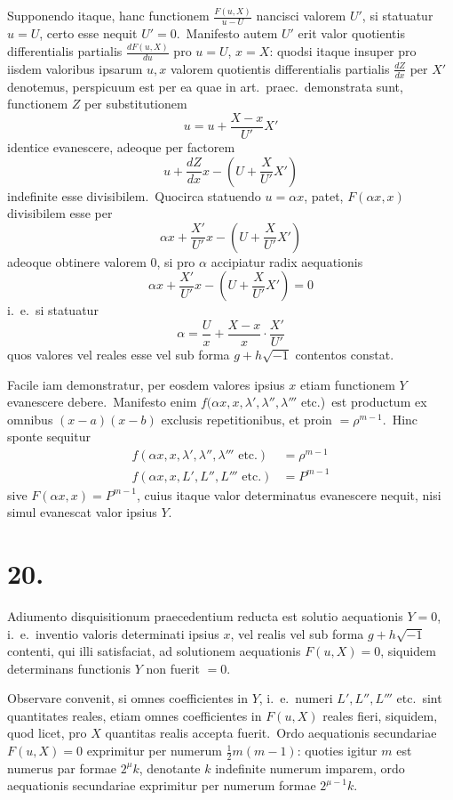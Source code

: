 \documentclass[12pt,a4paper]{article}
\theoremstyle{plain}
\begin{document}
Supponendo itaque, hanc functionem $\frac{F(u, X)}{u - U}$ nancisci valorem $U'$, si statuatur $u = U$, certo esse nequit $U' = 0$.\ Manifesto autem $U'$ erit valor quotientis differentialis partialis $\frac{dF(u, X)}{du}$ pro $u = U$, $x = X$:
quodsi itaque insuper pro iisdem valoribus ipsarum $u, x$ valorem quotientis differentialis partialis $\frac{dZ}{dx}$ per $X'$ denotemus, perspicuum est per ea quae in art.\ praec.\ demonstrata sunt, functionem $Z$ per substitutionem
\[
u = u + \frac{X - x}{U'}X'
\]
identice evanescere, adeoque per factorem
\[
u + \frac{dZ}{dx}x - (U + \frac{X}{U'}X')
\]
indefinite esse divisibilem.\ Quocirca statuendo $u = \alpha x$, patet, $F(\alpha x, x)$ divisibilem esse per
\[
\alpha x + \frac{X'}{U'}x - (U + \frac{X}{U'}X')
\]
adeoque obtinere valorem $0$, si pro $\alpha$ accipiatur radix aequationis
\[
\alpha x + \frac{X'}{U'}x - (U + \frac{X}{U'}X') = 0
\]
i.\ e.\ si statuatur
\[
\alpha = \frac{U}{x} + \frac{X - x}{x} \cdot \frac{X'}{U'}
\]
quos valores vel reales esse vel sub forma $g + h\sqrt{-1}$ contentos constat.

Facile iam demonstratur, per eosdem valores ipsius $x$ etiam functionem $Y$
evanescere debere.\ Manifesto enim $f(\alpha x, x, \lambda', \lambda'', \lambda'''$ etc.)\ est productum ex omnibus $(x-a)(x-b)$ exclusis repetitionibus, et proin $= \rho^{m-1}$.\ Hinc sponte sequitur
\begin{align*}
f(\alpha x, x, \lambda', \lambda'', \lambda''' \text{ etc.}) &= \rho^{m-1} \\
f(\alpha x, x, L', L'', L''' \text{ etc.}) &= P^{m-1}
\end{align*}
sive $F(\alpha x, x) = P^{m-1}$, cuius itaque valor determinatus evanescere nequit, nisi simul evanescat valor ipsius $Y$.

\section*{20.}

Adiumento disquisitionum praecedentium reducta est solutio aequationis
$Y = 0$, i.\ e.\ inventio valoris determinati ipsius $x$, vel realis vel sub forma
$g + h\sqrt{-1}$ contenti, qui illi satisfaciat, ad solutionem aequationis $F(u, X) = 0$,
siquidem determinans functionis $Y$ non fuerit $= 0$.

Observare convenit, si omnes coefficientes in $Y$, i.\ e.\ numeri $L', L'', L'''$ etc.\ sint quantitates reales,
etiam omnes coefficientes in $F(u, X)$ reales fieri, siquidem, quod licet, pro $X$ quantitas realis accepta fuerit.\ Ordo aequationis secundariae $F(u, X) = 0$ exprimitur per numerum $\frac{1}{2}m(m-1)$: quoties igitur $m$ est numerus par formae $2^\mu k$, denotante $k$ indefinite numerum imparem, ordo aequationis secundariae exprimitur
per numerum formae $2^{\mu-1}k$.
\end{document}
